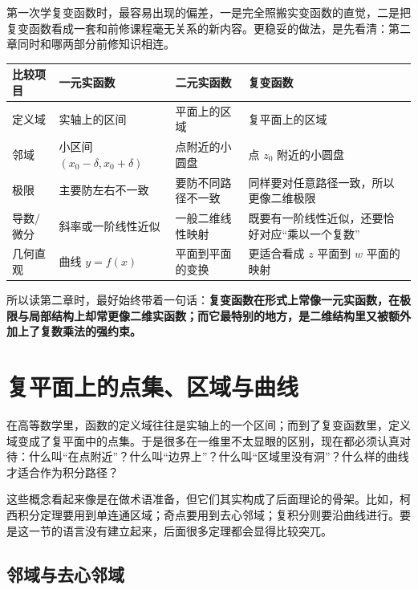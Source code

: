 \begin{tishi}[先把第二章和高等数学放在一张对照表里]
第一次学复变函数时，最容易出现的偏差，一是完全照搬实变函数的直觉，二是把复变函数看成一套和前修课程毫无关系的新内容。更稳妥的做法，是先看清：第二章同时和哪两部分前修知识相连。

\begin{center}
\small
\renewcommand{\arraystretch}{1.28}
\begin{tabular}{|p{}|p{}|p{}|p{}|}
\hline
比较项目 & 一元实函数 & 二元实函数 & 复变函数\\
\hline
定义域 & 实轴上的区间 & 平面上的区域 & 复平面上的区域\\
\hline
邻域 & 小区间 $(x_0-\delta,x_0+\delta)$ & 点附近的小圆盘 & 点 $z_0$ 附近的小圆盘\\
\hline
极限 & 主要防左右不一致 & 要防不同路径不一致 & 同样要对任意路径一致，所以更像二维极限\\
\hline
导数/微分 & 斜率或一阶线性近似 & 一般二维线性映射 & 既要有一阶线性近似，还要恰好对应``乘以一个复数''\\
\hline
几何直观 & 曲线 $y=f(x)$ & 平面到平面的变换 & 更适合看成 $z$ 平面到 $w$ 平面的映射\\
\hline
\end{tabular}
\end{center}

所以读第二章时，最好始终带着一句话：\textbf{复变函数在形式上常像一元实函数，在极限与局部结构上却常更像二维实函数；而它最特别的地方，是二维结构里又被额外加上了复数乘法的强约束。}
\end{tishi}

\section{复平面上的点集、区域与曲线}

\begin{wulibj}[为什么先讲这一节]
在高等数学里，函数的定义域往往是实轴上的一个区间；而到了复变函数里，定义域变成了复平面中的点集。于是很多在一维里不太显眼的区别，现在都必须认真对待：什么叫``在点附近''？什么叫``边界上''？什么叫``区域里没有洞''？什么样的曲线才适合作为积分路径？

这些概念看起来像是在做术语准备，但它们其实构成了后面理论的骨架。比如，柯西积分定理要用到单连通区域；奇点要用到去心邻域；复积分则要沿曲线进行。要是这一节的语言没有建立起来，后面很多定理都会显得比较突兀。
\end{wulibj}

\subsection{邻域与去心邻域}

